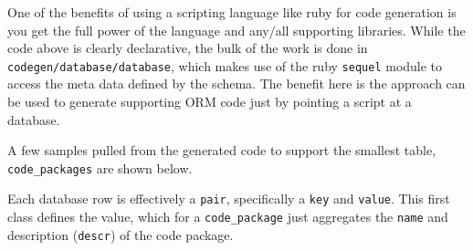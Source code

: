 \documentclass[11pt]{article}
\begin{document}
   One of the benefits of using a scripting language like ruby for
   code generation is you get the full power of the language and
   any/all supporting libraries. While the code above is clearly
   declarative, the bulk of the work is done in
   \texttt{codegen/database/database}, which makes use of the ruby \texttt{sequel}
   module to access the meta data defined by the schema. The benefit
   here is the approach can be used to generate supporting ORM code
   just by pointing a script at a database.

   A few samples pulled from the generated code to support the
   smallest table, \texttt{code\_packages} are shown below.

   Each database row is effectively a \texttt{pair}, specifically a \texttt{key} and
   \texttt{value}. This first class defines the value, which for a
   \texttt{code\_package} just aggregates the \texttt{name} and description (\texttt{descr})
   of the code package.
\end{document}
